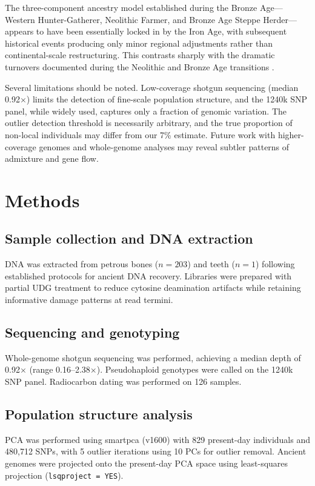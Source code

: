 \documentclass[11pt]{article}
\begin{document}
The three-component ancestry model established during the Bronze Age---Western Hunter-Gatherer, Neolithic Farmer, and Bronze Age Steppe Herder---appears to have been essentially locked in by the Iron Age, with subsequent historical events producing only minor regional adjustments rather than continental-scale restructuring. This contrasts sharply with the dramatic turnovers documented during the Neolithic and Bronze Age transitions \citep{haak2015massive,allentoft2015population}.

Several limitations should be noted. Low-coverage shotgun sequencing (median 0.92$\times$) limits the detection of fine-scale population structure, and the 1240k SNP panel, while widely used, captures only a fraction of genomic variation. The outlier detection threshold is necessarily arbitrary, and the true proportion of non-local individuals may differ from our 7\% estimate. Future work with higher-coverage genomes and whole-genome analyses may reveal subtler patterns of admixture and gene flow.

\section{Methods}

\subsection{Sample collection and DNA extraction}
DNA was extracted from petrous bones ($n = 203$) and teeth ($n = 1$) following established protocols for ancient DNA recovery. Libraries were prepared with partial UDG treatment to reduce cytosine deamination artifacts while retaining informative damage patterns at read termini.

\subsection{Sequencing and genotyping}
Whole-genome shotgun sequencing was performed, achieving a median depth of 0.92$\times$ (range 0.16--2.38$\times$). Pseudohaploid genotypes were called on the 1240k SNP panel. Radiocarbon dating was performed on 126 samples.

\subsection{Population structure analysis}
PCA was performed using smartpca (v1600) with 829 present-day individuals and 480,712 SNPs, with 5 outlier iterations using 10 PCs for outlier removal. Ancient genomes were projected onto the present-day PCA space using least-squares projection (\texttt{lsqproject = YES}).
\end{document}
